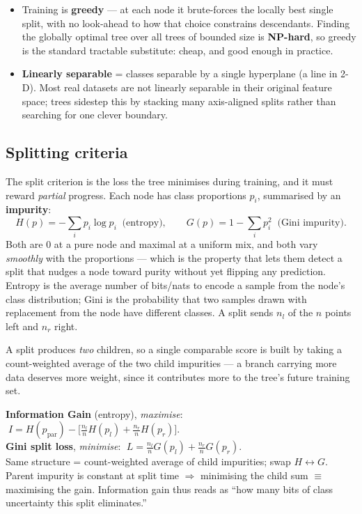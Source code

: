 \documentclass[11pt, a4paper]{article}
\newcommand{\kw}[1]{\textbf{#1}}
\begin{document}
\begin{itemize}
  \item Training is \kw{greedy} — at each node it brute-forces the locally best single split, with no
  look-ahead to how that choice constrains descendants. Finding the globally optimal tree over all
  trees of bounded size is \kw{NP-hard}, so greedy is the standard tractable substitute: cheap, and
  good enough in practice.
  \item \kw{Linearly separable} = classes separable by a single hyperplane (a line in 2-D). Most real
  datasets are not linearly separable in their original feature space; trees sidestep this by
  stacking many axis-aligned splits rather than searching for one clever boundary.
\end{itemize}

\subsection{Splitting criteria}

The split criterion is the loss the tree minimises during training, and it must reward
\emph{partial} progress. Each node has class proportions $p_i$, summarised by an \kw{impurity}:
\[
H(p) = -\textstyle\sum_i p_i\log p_i \;\;\text{(entropy)}, \qquad
G(p) = 1-\textstyle\sum_i p_i^2 \;\;\text{(Gini impurity)}.
\]
Both are $0$ at a pure node and maximal at a uniform mix, and both vary \emph{smoothly} with the
proportions — which is the property that lets them detect a split that nudges a node toward purity
without yet flipping any prediction. Entropy is the average number of bits/nats to encode a sample
from the node's class distribution; Gini is the probability that two samples drawn with replacement
from the node have different classes. A split sends $n_l$ of the $n$ points left and $n_r$ right.

A split produces \emph{two} children, so a single comparable score is built by taking a
count-weighted average of the two child impurities — a branch carrying more data deserves more
weight, since it contributes more to the tree's future training set.

\begin{defbox}
\kw{Information Gain} (entropy), \emph{maximise}:
$\;I = H(p_{\text{par}}) - \big[\tfrac{n_l}{n}H(p_l)+\tfrac{n_r}{n}H(p_r)\big]$. \\
\kw{Gini split loss}, \emph{minimise}:
$\;L = \tfrac{n_l}{n}G(p_l)+\tfrac{n_r}{n}G(p_r)$. \\
Same structure = count-weighted average of child impurities; swap $H\leftrightarrow G$. Parent
impurity is constant at split time $\Rightarrow$ minimising the child sum $\equiv$ maximising the
gain. Information gain thus reads as ``how many bits of class uncertainty this split eliminates.''
\end{defbox}
\end{document}
